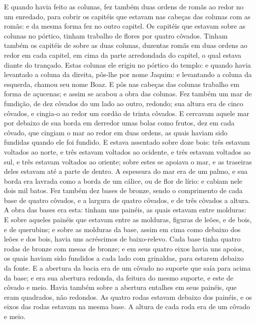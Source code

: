 {  E quando havia feito as colunas, fez também duas ordens de romãs ao redor no um enredado, para cobrir os capitéis que estavam nas cabeças das colunas com as romãs: e da mesma forma fez no outro capitel.
  Os capitéis que estavam sobre as colunas no pórtico, tinham trabalho de flores por quatro côvados.
  Tinham também os capitéis de sobre as duas colunas, duzentas romãs em duas ordens ao redor em cada capitel, em cima da parte arredondada do capitel, o qual estava diante do trançado. %
  Estas colunas ele erigiu no pórtico do templo: e quando havia levantado a coluna da direita, pôs-lhe por nome Jaquim: e levantando a coluna da esquerda, chamou seu nome Boaz.
  E pôs nas cabeças das colunas trabalho em forma de açucenas; e assim se acabou a obra das colunas.
  Fez também um mar de fundição, de dez côvados do um lado ao outro, redondo; sua altura era de cinco côvados, e cingia-o ao redor um cordão de trinta côvados.
  E cercavam aquele mar por debaixo de sua borda em derredor umas bolas como frutos, dez em cada côvado, que cingiam o mar ao redor em duas ordens, as quais haviam sido fundidas quando ele foi fundido.
  E estava assentado sobre doze bois: três estavam voltados ao norte, e três estavam voltados ao ocidente, e três estavam voltados ao sul, e três estavam voltados ao oriente; sobre estes se apoiava o mar, e as traseiras deles estavam até a parte de dentro.
  A espessura do mar era de um palmo, e sua borda era lavrada como a borda de um cálice, ou de flor de lírio: e cabiam nele dois mil batos.
  Fez também dez bases de bronze, sendo o comprimento de cada base de quatro côvados, e a largura de quatro côvados, e de três côvados a altura.
  A obra das bases era esta: tinham uns painéis, as quais estavam entre molduras:
  E sobre aqueles painéis que estavam entre as molduras, figuras de leões, e de bois, e de querubins; e sobre as molduras da base, assim em cima como debaixo dos leões e dos bois, havia uns acréscimos de baixo-relevo.
  Cada base tinha quatro rodas de bronze com mesas de bronze; e em seus quatro eixos havia uns apoios, os quais haviam sido fundidos a cada lado com grinaldas, para estarem debaixo da fonte.
  E a abertura da bacia era de um côvado no suporte que saía para acima da base; e era sua abertura redonda, da feitura do mesmo suporte, e este de côvado e meio. Havia também sobre a abertura entalhes em seus painéis, que eram quadrados, não redondos. %
  As quatro rodas estavam debaixo dos painéis, e os eixos das rodas estavam na mesma base. A altura de cada roda era de um côvado e meio.
}
